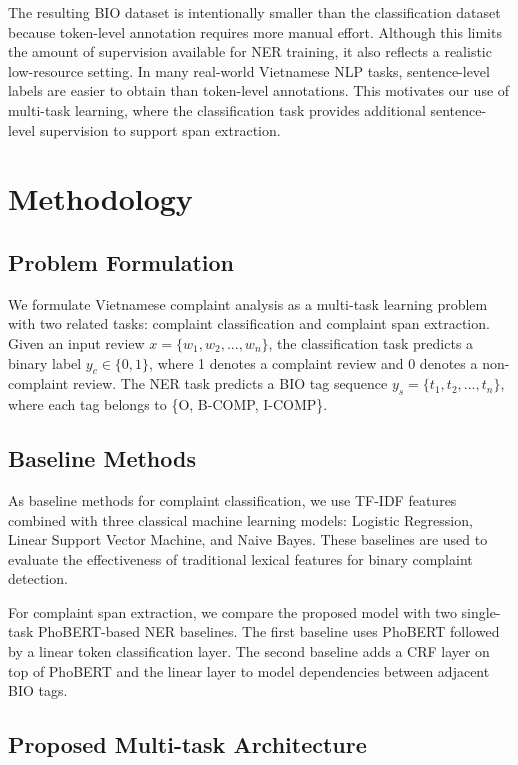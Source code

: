 \documentclass[11pt]{article}
\begin{document}
The resulting BIO dataset is intentionally smaller than the classification dataset because token-level annotation requires more manual effort. Although this limits the amount of supervision available for NER training, it also reflects a realistic low-resource setting. In many real-world Vietnamese NLP tasks, sentence-level labels are easier to obtain than token-level annotations. This motivates our use of multi-task learning, where the classification task provides additional sentence-level supervision to support span extraction.

\section{Methodology}

\subsection{Problem Formulation}

We formulate Vietnamese complaint analysis as a multi-task learning problem with two related tasks: complaint classification and complaint span extraction. Given an input review \(x = \{w_1, w_2, ..., w_n\}\), the classification task predicts a binary label \(y_c \in \{0, 1\}\), where 1 denotes a complaint review and 0 denotes a non-complaint review. The NER task predicts a BIO tag sequence \(y_s = \{t_1, t_2, ..., t_n\}\), where each tag belongs to \{O, B-COMP, I-COMP\}.

\subsection{Baseline Methods}

As baseline methods for complaint classification, we use TF-IDF features combined with three classical machine learning models: Logistic Regression, Linear Support Vector Machine, and Naive Bayes. These baselines are used to evaluate the effectiveness of traditional lexical features for binary complaint detection.

For complaint span extraction, we compare the proposed model with two single-task PhoBERT-based NER baselines. The first baseline uses PhoBERT followed by a linear token classification layer. The second baseline adds a CRF layer on top of PhoBERT and the linear layer to model dependencies between adjacent BIO tags.

\subsection{Proposed Multi-task Architecture}
\end{document}
